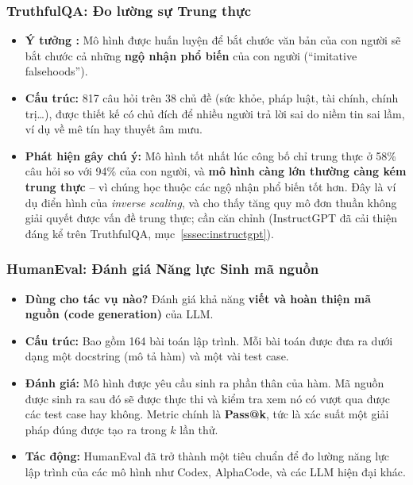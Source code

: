 \subsubsection{TruthfulQA: Đo lường sự Trung thực \newtag}
\label{sssec:truthfulqa}
\begin{itemize}
	\item \textbf{Ý tưởng \cite{lin2022truthfulqa}:} Mô hình được huấn luyện để bắt chước văn bản của con người sẽ bắt chước cả những \textbf{ngộ nhận phổ biến} của con người (“imitative falsehoods”).
	\item \textbf{Cấu trúc:} 817 câu hỏi trên 38 chủ đề (sức khỏe, pháp luật, tài chính, chính trị\ldots), được thiết kế có chủ đích để nhiều người trả lời sai do niềm tin sai lầm, ví dụ về mê tín hay thuyết âm mưu.
	\item \textbf{Phát hiện gây chú ý:} Mô hình tốt nhất lúc công bố chỉ trung thực ở 58\% câu hỏi so với 94\% của con người, và \textbf{mô hình càng lớn thường càng kém trung thực} -- vì chúng học thuộc các ngộ nhận phổ biến tốt hơn. Đây là ví dụ điển hình của \emph{inverse scaling}, và cho thấy tăng quy mô đơn thuần không giải quyết được vấn đề trung thực; cần căn chỉnh (InstructGPT đã cải thiện đáng kể trên TruthfulQA, mục~\ref{sssec:instructgpt}).
\end{itemize}

\subsubsection{HumanEval: Đánh giá Năng lực Sinh mã nguồn}
\begin{itemize}
    \item \textbf{Dùng cho tác vụ nào?} Đánh giá khả năng \textbf{viết và hoàn thiện mã nguồn (code generation)} của LLM.
    \item \textbf{Cấu trúc:} Bao gồm 164 bài toán lập trình. Mỗi bài toán được đưa ra dưới dạng một docstring (mô tả hàm) và một vài test case.
    \item \textbf{Đánh giá:} Mô hình được yêu cầu sinh ra phần thân của hàm. Mã nguồn được sinh ra sau đó sẽ được thực thi và kiểm tra xem nó có vượt qua được các test case hay không. Metric chính là \textbf{Pass@k}, tức là xác suất một giải pháp đúng được tạo ra trong $k$ lần thử.
    \item \textbf{Tác động:} HumanEval đã trở thành một tiêu chuẩn để đo lường năng lực lập trình của các mô hình như Codex, AlphaCode, và các LLM hiện đại khác.
\end{itemize}

